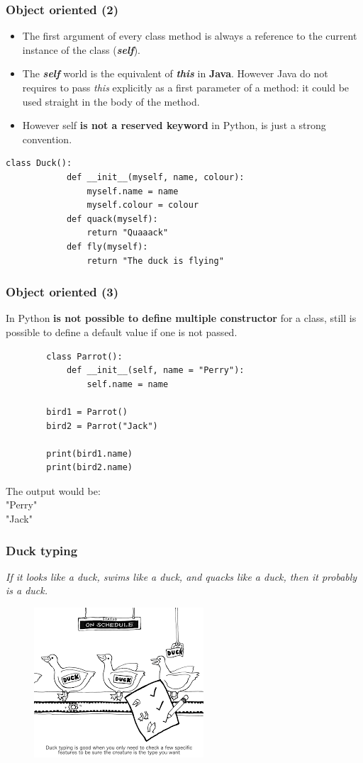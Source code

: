 \documentclass[xcolor ={table,usenames,dvipsnames}]{beamer}
\theoremstyle{definition}
\begin{document}
	\begin{frame}[fragile]
		\frametitle{Object oriented (2)}
		\begin{itemize}
			\item The first argument of every class method is always a reference to the current instance of the class (\textit{\textbf{self}}).
			\item The \textbf{\textit{self}} world is the equivalent of \textbf{\textit{this}} in \textbf{Java}. However Java do not requires to pass \textit{this} explicitly as a first parameter of a method: it could be used straight in the body of the method.
			\item However self\textbf{ is not a reserved keyword} in Python, is just a strong convention.
		\end{itemize}
		\begin{lstlisting}[basicstyle=\fontsize{2}{4}\selectfont\ttfamily\tiny]
		class Duck():
			def __init__(myself, name, colour):
				myself.name = name
				myself.colour = colour
			def quack(myself):
				return "Quaaack"	
			def fly(myself):
				return "The duck is flying"
		\end{lstlisting}
	\end{frame}

	\begin{frame}[fragile]
		\frametitle{Object oriented (3)}
		In Python \textbf{is not possible to define multiple constructor} for a class, still is possible to define a default value if one is not passed.
		
		\begin{lstlisting}
		class Parrot():
			def __init__(self, name = "Perry"):
				self.name = name
		
		bird1 = Parrot()
		bird2 = Parrot("Jack")
		
		print(bird1.name)
		print(bird2.name)
		\end{lstlisting}
		The output would be:\\
		"Perry"\\
		"Jack"
	\end{frame}

	\begin{frame}
		\frametitle{Duck typing}
		\textit{ If it looks like a duck, swims like a duck, and quacks like a duck, then it probably is a duck.}\\
		\begin{figure}[h!]
			\centering
			\includegraphics[scale=0.85]{img/duck.png}
			\label{Interfacce di un CS}
		\end{figure}
	\end{frame}
\end{document}
